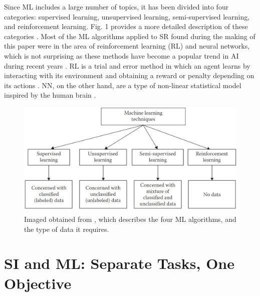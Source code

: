 \documentclass[twocolumn]{bmcart}%
\begin{document}
Since ML includes a large number of topics, it has been divided into four categories: supervised learning, unsupervised learning, semi-supervised learning, and reinforcement learning. Fig. 1 provides a more detailed description of these categories \cite{Mohammed}. Most of the ML algorithms applied to SR found during the making of this paper were in the area of reinforcement learning (RL) and neural networks, which is not surprising as these methods have become a popular trend in AI during recent years \cite{Corea}. RL is a trial and error method in which an agent learns by interacting with its environment and obtaining a reward or penalty depending on its actions \cite{Iima2}. NN, on the other hand, are a type of non-linear statistical model inspired by the human brain \cite{Hastie}. 

\begin{figure}[H]
 \begin{center} 
  \includegraphics[width=\linewidth]{Types_of_ML.jpg}
  \caption{Imaged obtained from \cite{Mohammed}, which describes the four ML algorithms, and the type of data it requires.}
  \end{center}
\end{figure}


\section*{SI and ML: Separate Tasks, One Objective}
\end{document}
